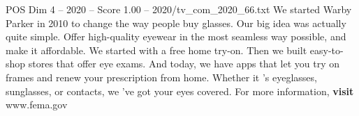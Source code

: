 \begin{textsample}{POS Dim 4 – 2020 – Score 1.00 – 2020/tv\_com\_2020\_66.txt}  \label{ex:f4_pos_044}
We started Warby Parker in 2010 to change the way people buy glasses.
Our big idea was actually quite simple.
Offer high-quality eyewear in the most seamless way possible, and make it affordable.
We started with a free home try-on.
Then we built easy-to-shop stores that offer eye exams.
And today, we have apps that let you try on frames and renew your prescription from home.
Whether it 's eyeglasses, sunglasses, or contacts, we 've got your eyes covered.
For more information, \textbf{visit} www.fema.gov

\end{textsample}
